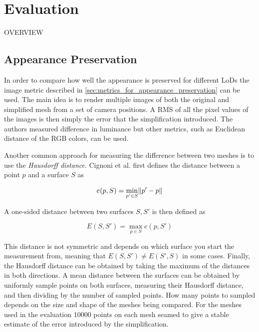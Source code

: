\clearpage

  


\section{Evaluation} \label{sec:evaluation}
OVERVIEW

\subsection{Appearance Preservation}
In order to compare how well the appearance is preserved for different LoDs the image metric described in \cref{sec:metrics_for_appearance_preservation} can be used. The main idea is to render multiple images of both the original and simplified mesh from a set of camera positions. A RMS of all the pixel values of the images is then simply the error that the simplification introduced. The authors \cite{lindstrom2000image} measured difference in luminance but other metrics, such as Euclidean distance of the RGB colors, can be used.



Another common approach for measuring the difference between two meshes is to use the \emph{Hausdorff distance}. Cignoni et al. \cite{cignoni1998metro} first defines the distance between a point $p$ and a surface $S$ as

\[e(p, S) = \min_{p' \in S} \norm*{p' - p}\]

A one-sided distance between two surfaces \(S, S'\) is then defined as

\[E(S, S') = \max_{p \in S} e(p, S')\]

This distance is not symmetric and depends on which surface you start the measurement from, meaning that \(E(S, S') \neq E(S', S)\) in some cases. Finally, the Hausdorff distance can be obtained by taking the maximum of the distances in both directions. A mean distance between the surfaces can be obtained by uniformly sample points on both surfaces, measuring their Hausdorff distance, and then dividing by the number of sampled points. How many points to sampled depends on the size and shape of the meshes being compared. For the meshes used in the evaluation 10000 points on each mesh seamed to give a stable estimate of the error introduced by the simplification.

